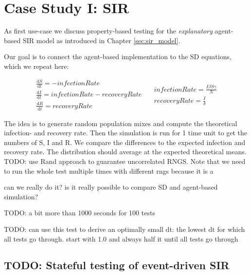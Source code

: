 \section{Case Study I: SIR}
\label{sec:case_SIR}
As first use-case we discuss property-based testing for the \textit{explanatory} agent-based SIR model as introduced in Chapter \ref{sec:sir_model}. 

Our goal is to connect the agent-based implementation to the SD equations, which we repeat here:

\begin{equation}
\begin{split}
\frac{\mathrm d S}{\mathrm d t} = -infectionRate \\
\frac{\mathrm d I}{\mathrm d t} = infectionRate - recoveryRate \\
\frac{\mathrm d R}{\mathrm d t} = recoveryRate 
\end{split}
\quad
\begin{split}
infectionRate = \frac{I \beta S \gamma}{N} \\
recoveryRate = \frac{I}{\delta} 
\end{split}
\end{equation}

The idea is to generate random population mixes and compute the theoretical infection- and recovery rate. Then the simulation is run for 1 time unit to get the numbers of S, I and R. We compare the differences to the expected infection and recovery rate. The distribution should average at the expected theoretical means. TODO: use Rand approach to guarantee uncorrelated RNGS. Note that we need to run the whole test multiple times with different rngs because it is a  

can we really do it? is it really possible to compare SD and agent-based simulation? 

TODO: a bit more than 1000 seconds for 100 tests

TODO: can use this test to derive an optimally small dt: the lowest dt for which all tests go through. start with 1.0 and always half it until all tests go through

\subsection{TODO: Stateful testing of event-driven SIR}